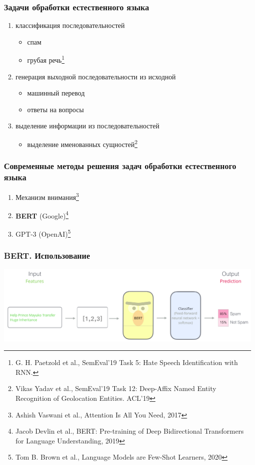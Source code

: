 \documentclass{beamer}
\begin{document}
\begin{frame}
\frametitle{Задачи обработки естественного языка}
\begin{enumerate}
	\item классификация последовательностей
		\begin{itemize}
			\item спам
			\item грубая речь\footnote[1]{G. H. Paetzold et al., SemEval'19 Task 5: Hate Speech Identification with RNN.}
		\end{itemize}
	\item генерация выходной последовательности из исходной
		\begin{itemize}
			\item машинный перевод
			\item ответы на вопросы
		\end{itemize}
	\item выделение информации из последовательностей
		\begin{itemize}
			\item выделение именованных сущностей\footnote[2]{Vikas Yadav et al., SemEval'19 Task 12: Deep-Affix Named Entity Recognition of Geolocation Entities. ACL'19}
		\end{itemize}
\end{enumerate}

\end{frame}

\begin{frame}
	\frametitle{Современные методы решения задач обработки естественного языка}
	\begin{enumerate}
		\item Механизм внимания\footnote[1]{Ashish Vaswani et al., Attention Is All You Need, 2017}
		\item {\bf BERT} (Google)\footnote[2]{Jacob Devlin et al., BERT: Pre-training of Deep Bidirectional Transformers for Language Understanding, 2019}
		\item GPT-3 (OpenAI)\footnote[3]{Tom B. Brown et al., Language Models are Few-Shot Learners, 2020}
	\end{enumerate}
\end{frame}

\begin{frame}
	\frametitle{BERT. Использование}
	\begin{center}
		\includegraphics[scale=0.35]{bert_usage.png}
	\end{center}
\end{frame}
\end{document}

